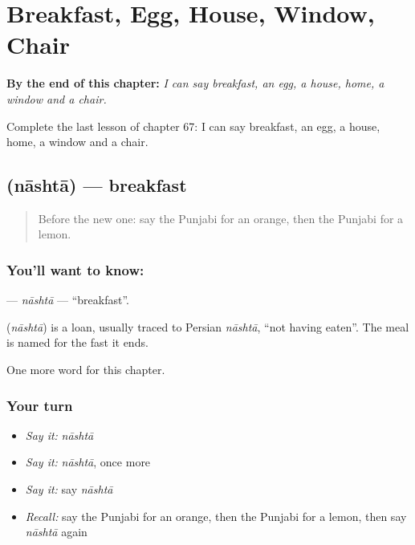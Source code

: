 
\chapter{Breakfast, Egg, House, Window, Chair}
\label{ch:pa-breakfast-egg-house-window-chair}

\begin{chapteropening}
\textbf{By the end of this chapter:} \emph{I can say breakfast, an egg, a house, home, a window and a chair.}

Complete the last lesson of chapter 67: I can say breakfast, an egg, a house, home, a window and a chair.
\end{chapteropening}

\section[\texorpdfstring{\pa{ਨਾਸ਼ਤਾ} (nāshtā)}{ਨਾਸ਼ਤਾ (nāshtā)}]{ (nāshtā) — breakfast}

\label{lesson:PA-C67-nashta}



\begin{quote}
Before the new one: say the Punjabi for an orange, then the Punjabi for a lemon.
\end{quote}

\subsection*{You'll want to know: }
\textbf{} — \emph{nāshtā} — \textquotedblleft{}breakfast\textquotedblright{}.

\begin{cousinweb}
\textbf{} (\emph{nāshtā}) is a loan, usually traced to Persian \emph{nāshtā}, \textquotedblleft{}not having eaten\textquotedblright{}. The meal is named for the fast it ends.
\end{cousinweb}

\begin{grammarlens}[title={What you've built}]
One more word for this chapter.
\end{grammarlens}

\subsection*{Your turn}
\begin{itemize}
\raggedright
  \item \emph{Say it:} \emph{nāshtā}
  \item \emph{Say it:} \emph{nāshtā}, once more
  \item \emph{Say it:} say \emph{nāshtā}
  \item \emph{Recall:} say the Punjabi for an orange, then the Punjabi for a lemon, then say \emph{nāshtā} again
\end{itemize}

